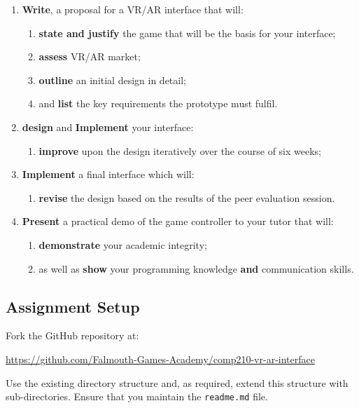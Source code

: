 \documentclass{../../fal_assignment}
\begin{document}
\begin{enumerate}[label=(\Alph*)]
    \item \textbf{Write}, a proposal for a VR/AR interface that will:
    	\begin{enumerate}[label=\roman*.]
    		\item \textbf{state and justify} the game that will be the basis for your interface;
		\item \textbf{assess} VR/AR market;
		\item \textbf{outline} an initial design in detail;
		\item and \textbf{list} the key requirements the prototype must fulfil.
	\end{enumerate}
    \item \textbf{design} and \textbf{Implement} your interface:
    	\begin{enumerate}[label=\roman*.]
		\item \textbf{improve} upon the design iteratively over the course of six weeks;
	\end{enumerate}
    \item \textbf{Implement} a final interface which will:
    	\begin{enumerate}[label=\roman*.]
		\item \textbf{revise} the design based on the results of the peer evaluation session.
	\end{enumerate}
    \item \textbf{Present} a practical demo of the game controller to your tutor that will:
    	\begin{enumerate}[label=\roman*.]
    		\item \textbf{demonstrate} your academic integrity;
    		\item as well as \textbf{show} your programming knowledge \textbf{and} communication skills.
	\end{enumerate}
\end{enumerate}

\subsection*{Assignment Setup}

Fork the GitHub repository at:

\indent \url{https://github.com/Falmouth-Games-Academy/comp210-vr-ar-interface }

Use the existing directory structure and, as required, extend this structure with sub-directories. Ensure that you maintain the \texttt{readme.md} file.
\end{document}
